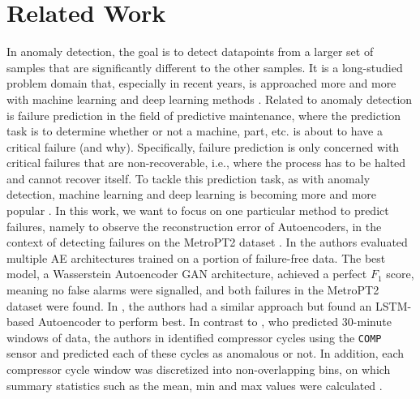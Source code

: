 \section{Related Work}
\label{sec:related}
In anomaly detection, the goal is to detect datapoints from a larger set of samples that are significantly different to the other samples.
It is a long-studied problem domain that, especially in recent years, is approached more and more with machine learning and deep learning methods \cite{chandolaAnomalyDetectionSurvey2009,pangDeepLearningAnomaly2021}.
Related to anomaly detection is failure prediction in the field of predictive maintenance, where the prediction task is to determine whether or not a machine, part, etc. is about to have a critical failure (and why).
Specifically, failure prediction is only concerned with critical failures that are non-recoverable, i.e., where the process has to be halted and cannot recover itself.
To tackle this prediction task, as with anomaly detection, machine learning and deep learning is becoming more and more popular \cite{carvalhoSystematicLiteratureReview2019,serradillaDeepLearningModels2022}.
In this work, we want to focus on one particular method to predict failures, namely to observe the reconstruction error of Autoencoders, in the context of detecting failures on the MetroPT2 dataset \cite{MetroPT2}.
In \cite{silva2023predictive} the authors evaluated multiple AE architectures trained on a portion of failure-free data.
The best model, a Wasserstein Autoencoder GAN architecture, achieved a perfect $F_1$ score, meaning no false alarms were signalled, and both failures in the MetroPT2 dataset were found.
In \cite{gamaFaultDetectionAnomaly2024}, the authors had a similar approach but found an LSTM-based Autoencoder to perform best.
In contrast to \cite{silva2023predictive}, who predicted 30-minute windows of data, the authors in \cite{gamaFaultDetectionAnomaly2024} identified compressor cycles using the \texttt{COMP} sensor and predicted each of these cycles as anomalous or not.
In addition, each compressor cycle window was discretized into non-overlapping bins, on which summary statistics such as the mean, min and max values were calculated \cite{davariPredictiveMaintenanceBased2021}.

